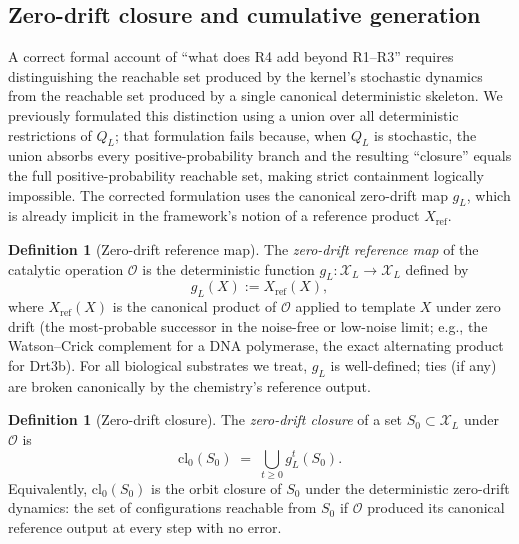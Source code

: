 \documentclass[11pt]{article}
\theoremstyle{plain}
\theoremstyle{definition}
\newtheorem{definition}[theorem]{Definition}
\newcommand{\Xset}{\mathcal{X}}
\newcommand{\Op}{\mathcal{O}}
\begin{document}
\subsection{Zero-drift closure and cumulative generation}
\label{subsec:gen_def}

A correct formal account of ``what does R4 add beyond R1--R3'' requires distinguishing the reachable set produced by the kernel's stochastic dynamics from the reachable set produced by a single canonical deterministic skeleton. We previously formulated this distinction using a union over all deterministic restrictions of $Q_L$; that formulation fails because, when $Q_L$ is stochastic, the union absorbs every positive-probability branch and the resulting ``closure'' equals the full positive-probability reachable set, making strict containment logically impossible. The corrected formulation uses the canonical zero-drift map $g_L$, which is already implicit in the framework's notion of a reference product $X_{\mathrm{ref}}$.

\begin{definition}[Zero-drift reference map]
\label{def:gL}
The \emph{zero-drift reference map} of the catalytic operation $\Op$ is the deterministic function $g_L : \Xset_L \to \Xset_L$ defined by
\[
g_L(X) := X_{\mathrm{ref}}(X),
\]
where $X_{\mathrm{ref}}(X)$ is the canonical product of $\Op$ applied to template $X$ under zero drift (the most-probable successor in the noise-free or low-noise limit; e.g., the Watson--Crick complement for a DNA polymerase, the exact alternating product for Drt3b). For all biological substrates we treat, $g_L$ is well-defined; ties (if any) are broken canonically by the chemistry's reference output.
\end{definition}

\begin{definition}[Zero-drift closure]
\label{def:cl0}
The \emph{zero-drift closure} of a set $S_0 \subset \Xset_L$ under $\Op$ is
\begin{equation}
\mathrm{cl}_0(S_0) \;=\; \bigcup_{t \ge 0} g_L^t(S_0).
\end{equation}
Equivalently, $\mathrm{cl}_0(S_0)$ is the orbit closure of $S_0$ under the deterministic zero-drift dynamics: the set of configurations reachable from $S_0$ if $\Op$ produced its canonical reference output at every step with no error.
\end{definition}
\end{document}
